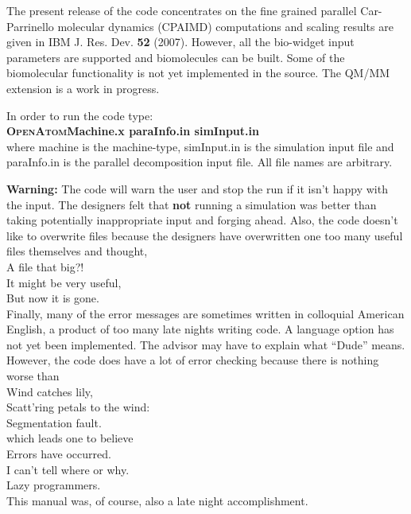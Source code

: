 \documentclass[12pt]{article}
\begin{document}
The present release of the code concentrates on the fine grained
parallel Car-Parrinello molecular dynamics (CPAIMD) computations 
and scaling results are given in IBM J. Res. Dev. {\bf 52} (2007). 
However, all the 
bio-widget input parameters are supported and biomolecules can be
built. Some of the biomolecular functionality is not yet implemented
in the source. The QM/MM extension is a work in progress.

In order to run the code type: \\
\hspace*{1.5in} {\bf \textsc{OpenAtom}Machine.x paraInfo.in simInput.in} \\
where machine is the machine-type, simInput.in is the simulation input
file and paraInfo.in is the parallel decomposition input file. 
All file names are arbitrary.

{\bf Warning:} The code will warn the user and stop the run if it isn't happy
with the input. The designers felt that {\bf not} running a
simulation was better than taking potentially inappropriate input 
and forging ahead. 
Also, the code doesn't like to overwrite files because the designers
have overwritten one too many useful files themselves and thought,  \\
\hspace*{1.25in}  A file that big?! \\
\hspace*{1.25in}  It might be very useful,\\
\hspace*{1.25in}  But now it is gone.\\
Finally, many of the error messages are sometimes written in colloquial American English, 
a product of too many late nights writing code. A language option has
not yet been implemented. The advisor may have to explain what
``Dude'' means.  However, the code does have a lot of error
checking because there is nothing worse than \\
\hspace*{1.25in}    Wind catches lily, \\
\hspace*{1.25in}    Scatt'ring petals to the wind:\\
\hspace*{1.25in}    Segmentation fault.\\
which leads one to believe \\
\hspace*{1.25in}  Errors have occurred. \\
\hspace*{1.25in}  I can't tell where or why.\\
\hspace*{1.25in}  Lazy programmers.\\
This manual was, of course, also a late night accomplishment.
\end{document}
